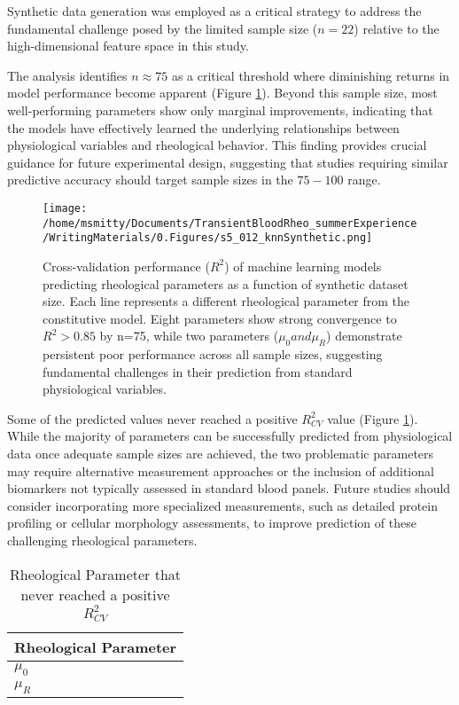 \documentclass[12pt,letterpaper]{article}
\begin{document}
Synthetic data generation was employed as a critical strategy to address the fundamental challenge posed by the limited sample size ($n=22$)
relative to the high-dimensional feature space in this study. 

The analysis identifies $n\approx 75$ as a critical threshold where diminishing returns in model performance become apparent (Figure \ref{fig:s5012}).
Beyond this sample size, most well-performing parameters show only marginal improvements, indicating that the models have effectively
learned the underlying relationships between physiological variables and rheological behavior. This finding provides crucial guidance for
future experimental design, suggesting that studies requiring similar predictive accuracy should target sample sizes in the $75-100$ range.

\begin{figure}[ht]
    \centering
    \texttt{[image: /home/msmitty/Documents/TransientBloodRheo\_summerExperience/WritingMaterials/0.Figures/s5\_012\_knnSynthetic.png]}
    \caption{Cross-validation performance ($R^2$) of machine learning models predicting rheological parameters as a function of
    synthetic dataset size. Each line represents a different rheological parameter from the constitutive model.
    Eight parameters show strong convergence to $R^2 > 0.85$ by n=75, while two parameters ($\mu_0 and \mu_R$) demonstrate persistent
    poor performance across all sample sizes, suggesting fundamental challenges in their prediction from standard physiological variables.}
    \label{fig:s5012}
\end{figure}

Some of the predicted values never reached a positive $R^2_{CV}$ value (Figure \ref{tab:noSyn}). While the majority of parameters can be successfully
predicted from physiological data once adequate sample sizes are achieved,
the two problematic parameters may require alternative measurement approaches or the inclusion of additional biomarkers not typically
assessed in standard blood panels. Future studies should consider incorporating more specialized measurements, such as detailed protein
profiling or cellular morphology assessments, to improve prediction of these challenging rheological parameters.

\begin{table}[ht]
    \centering
    \caption{Rheological Parameter that never reached a positive $R^2_{CV}$}
    \begin{tabular}{l}
        Rheological Parameter\\
        \hline
        $\mu_0$\\
        $\mu_R$
    \end{tabular}
    \label{tab:noSyn}
\end{table}
\end{document}
